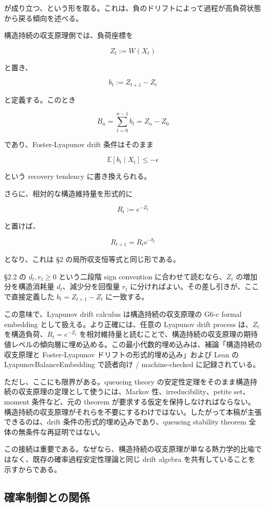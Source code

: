 \documentclass[12pt,a4paper]{article}
\begin{document}
が成り立つ、という形を取る。これは、負のドリフトによって過程が高負荷状態から戻る傾向を述べる。

構造持続の収支原理側では、負荷座標を

\[
Z_{t} := W(X_{t})
\]

と置き、

\[
b_{t} := Z_{t+1}-Z_{t}
\]

と定義する。このとき

\[
B_{n} = \sum_{t=0}^{n-1} b_{t} = Z_{n}-Z_0
\]

であり、Foster-Lyapunov drift 条件はそのまま

\[
\mathbb E[b_{t}\mid X_{t}]\le -\epsilon
\]

という recovery tendency に書き換えられる。

さらに、相対的な構造維持量を形式的に

\[
R_{t} := e^{-Z_{t}}
\]

と置けば、

\[
R_{t+1}=R_{t} e^{-b_{t}}
\]

となり、これは §2 の局所収支恒等式と同じ形である。

§2.2 の \(d_{t},r_{t}\ge 0\) という二段階 sign convention に合わせて読むなら、\(Z_{t}\) の増加分を構造消耗量 \(d_{t}\)、減少分を回復量 \(r_{t}\) に分ければよい。その差し引きが、ここで直接定義した \(b_{t}=Z_{t+1}-Z_{t}\) に一致する。

この意味で、Lyapunov drift calculus は構造持続の収支原理の G6-c formal embedding として扱える。より正確には、任意の Lyapunov drift process は、\(Z_{t}\) を構造負荷、\(R_{t}=e^{-Z_{t}}\) を相対維持量と読むことで、構造持続の収支原理の期待値レベルの傾向層に埋め込める。この最小代数的埋め込みは、補論「構造持続の収支原理と Foster-Lyapunov ドリフトの形式的埋め込み」および Lean の LyapunovBalanceEmbedding で読者向け / machine-checked に記録されている。

ただし、ここにも限界がある。queueing theory の安定性定理をそのまま構造持続の収支原理の定理として使うには、Markov 性、irreducibility、petite set、moment 条件など、元の theorem が要求する仮定を保持しなければならない。構造持続の収支原理がそれらを不要にするわけではない。したがって本稿が主張できるのは、drift 条件の形式的埋め込みであり、queueing stability theorem 全体の無条件な再証明ではない。

この接続は重要である。なぜなら、構造持続の収支原理が単なる熱力学的比喩ではなく、既存の確率過程安定性理論と同じ drift algebra を共有していることを示すからである。

\subsection{確率制御との関係}\label{ux78baux7387ux5236ux5fa1ux3068ux306eux95a2ux4fc2}
\end{document}
